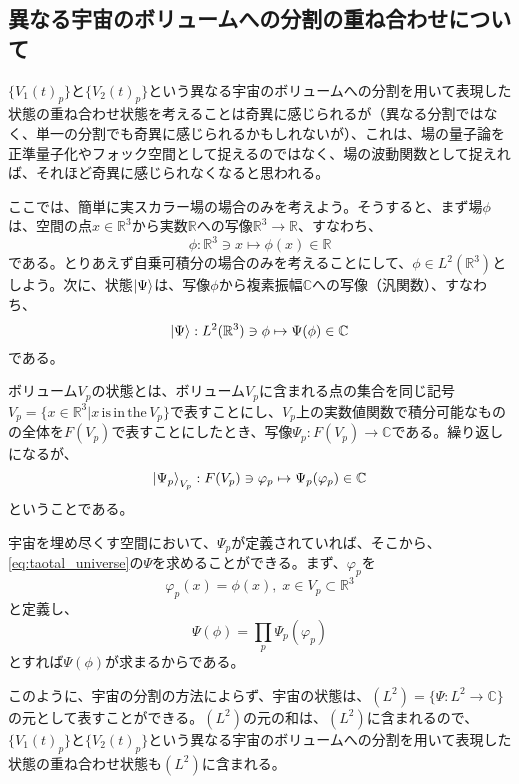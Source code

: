 \subsection{異なる宇宙のボリュームへの分割の重ね合わせについて}
$\{V_1(t)_p\}$と$\{V_2(t)_p\}$という異なる宇宙のボリュームへの分割を用いて表現した状態の重ね合わせ状態を考えることは奇異に感じられるが（異なる分割ではなく、単一の分割でも奇異に感じられるかもしれないが）、これは、場の量子論を正準量子化やフォック空間として捉えるのではなく、場の波動関数として捉えれば、それほど奇異に感じられなくなると思われる。\par
ここでは、簡単に実スカラー場の場合のみを考えよう。そうすると、まず場$\phi$は、空間の点$x \in \mathbb{R}^3$から実数$\mathbb{R}$への写像$\mathbb{R}^3 \to \mathbb{R}$、すなわち、
\begin{equation}
    \phi : \mathbb{R}^3 \ni x \mapsto \phi (x) \in \mathbb{R}
\end{equation}
である。とりあえず自乗可積分の場合のみを考えることにして、$\phi \in L^2(\mathbb{R}^3)$としよう。次に、状態$\ket{\Psi}$は、写像$\phi$から複素振幅$\mathbb{C}$への写像（汎関数）、すなわち、
\begin{equation}
    \label{eq:taotal_universe}
    \ket{\Psi} :  L^2(\mathbb{R}^3) \ni \phi \mapsto \Psi (\phi) \in \mathbb{C}
\end{equation}
である。\par
ボリューム$V_p$の状態とは、ボリューム$V_p$に含まれる点の集合を同じ記号$V_p=\{x \in \mathbb{R}^3 | x \mathrm{\, is\, in\, the\, }V_p\}$で表すことにし、$V_p$上の実数値関数で積分可能なものの全体を$F(V_p)$で表すことにしたとき、写像$\Psi_p : F(V_p) \to \mathbb{C}$である。繰り返しになるが、
\begin{equation}
    \ket{\Psi_p}_{V_p} :  F(V_p) \ni \varphi_p \mapsto \Psi_p (\varphi_p) \in \mathbb{C}
\end{equation}
ということである。\par
宇宙を埋め尽くす空間において、$\Psi_p$が定義されていれば、そこから、\eqref{eq:taotal_universe}の$\Psi$を求めることができる。まず、$\varphi_p$を
\begin{equation}
     \varphi_p(x) = \phi(x),\; x \in V_p \subset \mathbb{R}^3
\end{equation}
と定義し、
\begin{equation}
    \Psi (\phi) = \prod_p \Psi_p(\varphi_p)
\end{equation}
とすれば$\Psi (\phi)$が求まるからである。\par
このように、宇宙の分割の方法によらず、宇宙の状態は、$(L^2) = \{\Psi : L^2 \to \mathbb{C}\}$の元として表すことができる。$(L^2)$の元の和は、$(L^2)$に含まれるので、$\{V_1(t)_p\}$と$\{V_2(t)_p\}$という異なる宇宙のボリュームへの分割を用いて表現した状態の重ね合わせ状態も$(L^2)$に含まれる。